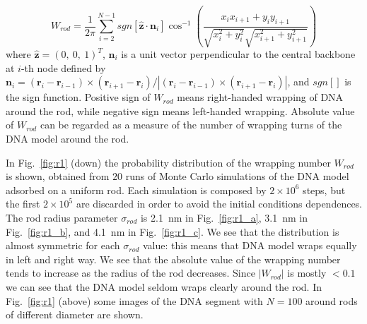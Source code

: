 \documentclass[a4paper,10pt]{article}
\begin{document}
\begin{equation}\label{eq:wrap_rod}
W_{rod}=\dfrac{1}{2\pi}\sum_{i=2}^{N-1} sgn\left [\hat{\textbf{z}}\cdot\textbf{n}_{i}\right ]\cos^{-1}\left (\dfrac{x_{i}x_{i+1}+y_{i}y_{i+1}}{\sqrt{x_{i}^2+y_{i}^2}\sqrt{x_{i+1}^2+y_{i+1}^2}}\right )
\end{equation}
where $\hat{\textbf{z}}=\left (0,\ 0,\ 1\right )^T$, $\textbf{n}_i$ is a unit vector perpendicular to the central backbone at $i$-th node defined by  $\textbf{n}_i=\left (\textbf{r}_{i}-\textbf{r}_{i-1}\right )\times\left (\textbf{r}_{i+1}-\textbf{r}_{i}\right )/\left |\left (\textbf{r}_{i}-\textbf{r}_{i-1}\right )\times\left (\textbf{r}_{i+1}-\textbf{r}_{i}\right )\right |$, and $sgn\left [\right ]$ is the sign function.
Positive sign of $W_{rod}$ means right-handed wrapping of DNA around the rod, while negative sign means left-handed wrapping.
Absolute value of $W_{rod}$ can be regarded as a measure of the number of wrapping turns of the DNA model around the rod.

In Fig.~\ref{fig:r1} (down) the probability distribution of the wrapping number $W_{rod}$ is shown, obtained from $20$ runs of Monte Carlo simulations of the DNA model adsorbed on a uniform rod.
Each simulation is composed by $2\times 10^6$ steps, but the first $2\times 10^5$ are discarded in order to avoid the initial conditions dependences.
The rod radius parameter $\sigma_{rod}$ is \SI{2.1}{\nm} in Fig.~\ref{fig:r1_a}, \SI{3.1}{\nm} in Fig.~\ref{fig:r1_b}, and \SI{4.1}{\nm} in Fig.~\ref{fig:r1_c}.
We see that the distribution is almost symmetric for each $\sigma_{rod}$ value: this means that DNA model wraps equally in left and right way.
We see that the absolute value of the wrapping number tends to increase as the radius of the rod decreases.
Since $\left |W_{rod}\right |$ is mostly $<0.1$ we can see that the DNA model seldom wraps clearly around the rod.
In Fig.~\ref{fig:r1} (above) some images of the DNA segment with $N=100$ around rods of different diameter are shown.
\end{document}
